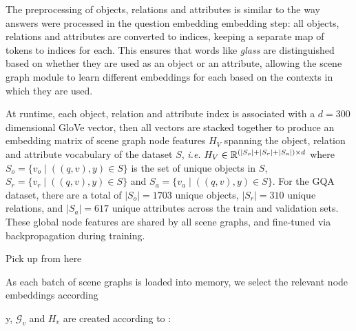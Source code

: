The preprocessing of objects, relations and attributes is similar to the way answers were processed in the question embedding embedding step: all objects, relations and attributes are converted to indices, keeping a separate map of tokens to indices for each. This ensures that words like \textit{glass} are distinguished based on whether they are used as an object or an attribute, allowing the scene graph module to learn different embeddings for each based on the contexts in which they are used.

At runtime, each object, relation and attribute index is associated with a \(d = 300\) dimensional GloVe vector, then all vectors are stacked together to produce an embedding matrix of scene graph node features \(H_V\) spanning the object, relation and attribute vocabulary of the dataset \(S\), \textit{i.e.} \(H_V \in \mathbb{R}^{(|S_o| + |S_r| + |S_a|) \times d}\) where \(S_o = \{v_o \mid ((q, v), y) \in S\}\) is the set of unique objects in \(S\), \(S_r = \{v_r \mid ((q, v), y) \in S\}\) and \(S_a = \{v_a \mid ((q, v), y) \in S\}\). For the GQA dataset, there are a total of \(|S_o| = 1703\) unique objects, \(|S_r| = 310\) unique relations, and \(|S_a| = 617\) unique attributes across the train and validation sets. These global node features are shared by all scene graphs, and fine-tuned via backpropagation  during training.

{\color{blue} Pick up from here}

 As each batch of scene graphs is loaded into memory, we select the relevant node embeddings according \(\)


y, \(\mathcal{G}_v\) and \(H_v\) are created according to \algorithmcfname{ \ref{algorithm:scene_graph_construction}}:


